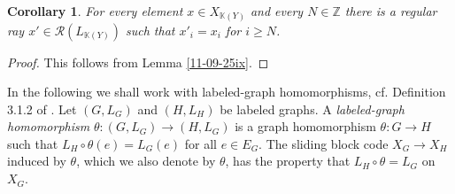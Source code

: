 \documentclass[12pt,oneside,english]{amsart}
\newtheorem{corollary}[thm]{Corollary}
\begin{document}
\begin{corollary}\label{12-09-25} For every element $x \in X_{\mathbb K(Y)}$ and every $N \in \mathbb Z$ there is a regular ray $x' \in \mathcal R(L_{\mathbb K(Y)})$ such that $x'_i = x_i$ for $i \geq N$.
\end{corollary}
\begin{proof} This follows from Lemma \ref{11-09-25ix}.
\end{proof}

In the following we shall work with labeled-graph homomorphisms, cf. Definition 3.1.2 of \cite{LM}. Let $(G,L_G)$ and $(H,L_H)$ be labeled graphs. A \emph{labeled-graph homomorphism} $\theta : (G,L_G) \to (H,L_G)$ is a graph homomorphism $\theta: G \to H$ such that $L_H \circ \theta(e)= L_G(e)$ for all $e \in E_G$. The sliding block code $X_G \to X_H$ induced by $\theta$, which we also denote by $\theta$, has the property that $L_H \circ \theta = L_G$ on $X_G$. 
\end{document}
